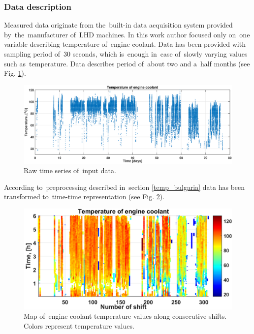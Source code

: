 \subsubsection{Data description}

Measured data originate from the~built-in data acquisition system provided by~the~manufacturer of~LHD machines. In this work author focused only on~one variable describing temperature of~engine coolant. Data has been provided with sampling period of~30 seconds, which is~enough in~case of~slowly varying values such as~temperature. Data describes period of~about two and a~half months (see Fig. \ref{fig: lhd_temp_raw}).

\begin{figure}[ht!]
\centering
\includegraphics[width = \textwidth]{wykresy/lhd_temp_raw.png}
\caption{Raw time series of~input data.}
\label{fig: lhd_temp_raw}
\end{figure}

According to~preprocessing described in~section \ref{temp_bulgaria} data has been transformed to~time-time representation (see Fig. \ref{fig: lhd_temp_map}).

\begin{figure}[ht!]
\centering
\includegraphics[width = \textwidth]{wykresy/lhd_temp_map.png}
\caption{Map of~engine coolant temperature values along consecutive shifts. Colors represent temperature values.}
\label{fig: lhd_temp_map}
\end{figure}

